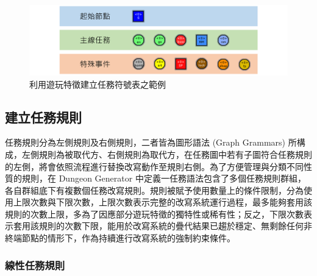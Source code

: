 \begin{figure}[ht]
  \begin{center}
    \includegraphics[width=1.0\textwidth]{figures/missiongrammars-alphabet.png}
    \caption{利用遊玩特徵建立任務符號表之範例} 
    \label{fig:missiongrammars-alphabet}
  \end{center}
\end{figure}




\subsection{建立任務規則}
\label{ssec:method-missiongrammars-rules}

任務規則分為左側規則及右側規則，二者皆為圖形語法 (Graph Grammars) 所構成，左側規則為被取代方、右側規則為取代方，在任務圖中若有子圖符合任務規則的左側，將會依照流程進行替換改寫動作至規則右側。為了方便管理與分類不同性質的規則，在 Dungeon Generator 中定義一任務語法包含了多個任務規則群組，各自群組底下有複數個任務改寫規則。規則被賦予使用數量上的條件限制，分為使用上限次數與下限次數，上限次數表示完整的改寫系統運行過程，最多能夠套用該規則的次數上限，多為了因應部分遊玩特徵的獨特性或稀有性；反之，下限次數表示套用該規則的次數下限，能用於改寫系統的疊代結果已趨於穩定、無剩餘任何非終端節點的情形下，作為持續進行改寫系統的強制約束條件。

\subsubsection{線性任務規則}
\label{sssec:method-missiongrammars-rules-linearrules}

